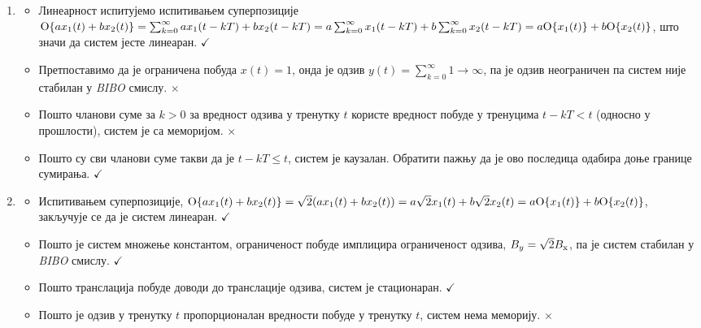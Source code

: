 \begin{enumerate}[label=(\alph*)]
    \item
    \begin{itemize}
    \item Линеарност испитујемо испитивањем суперпозиције
    ${\rm O}\{ a x_1(t) + b x_2(t) \} = \sum_{k = 0}^{\infty} ax_1(t-kT) + bx_2(t-kT) = 
    a \sum_{k = 0}^{\infty} x_1(t-kT) + b  \sum_{k = 0}^{\infty} x_2(t-kT) = a {\rm O}\{x_1(t)\} + b {\rm O}\{x_2(t)\}$,
    што значи да систем јесте линеаран.  \hfill $\checkmark$

    \item Претпоставимо да је ограничена побуда $x(t) = 1$, онда је одзив $y(t) = \sum_{k = 0}^{\infty} 1 \to \infty$, 
    па је одзив неограничен па систем није стабилан у \textit{BIBO} смислу. \hfill $\times$

    \item Пошто чланови суме за $k > 0$ за вредност одзива у тренутку $t$ користе вредност побуде у тренуцима $t - kT < t$
    (односно у прошлости), систем је са меморијом. \hfill $\times$
    
    \item Пошто су сви чланови суме такви да је $t - kT \leq t$, систем је каузалан. Обратити пажњу да је ово 
    последица одабира доње границе сумирања.  \hfill $\checkmark$
    \end{itemize}

    \item
    \begin{itemize}
        \item Испитивањем суперпозиције, ${\rm O}\{ a x_1(t) + b x_2(t) \} = \sqrt2 (ax_1(t) + bx_2(t)) = 
        a \sqrt 2 x_1(t) + b \sqrt 2 x_2(t)
        = a {\rm O}\{x_1(t)\} + b {\rm O}\{x_2(t)\}$, закључује се да је систем линеаран. \hfill $\checkmark$

        \item Пошто је систем множење константом, ограниченост побуде имплицира ограниченост одзива,
        $B_{y} = \sqrt 2 B_{\rm x}$, па је систем стабилан у \textit{BIBO} смислу. \hfill $\checkmark$

        \item Пошто транслација побуде доводи до транслације одзива, систем је стационаран. \hfill $\checkmark$

        \item Пошто је одзив у тренутку $t$ пропорционалан вредности побуде у тренутку $t$, систем нема меморију. \hfill $\times$
        

\end{itemize}
\end{enumerate}
